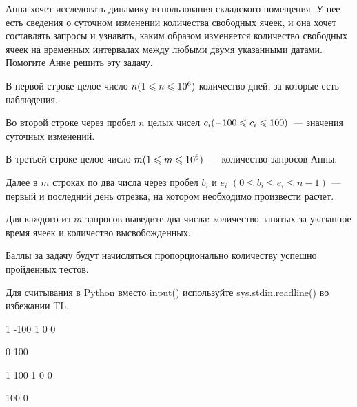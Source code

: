 
Анна хочет исследовать динамику использования складского помещения. У нее есть сведения о 
суточном изменении количества свободных ячеек, и она хочет составлять запросы и узнавать, 
каким образом изменяется количество свободных ячеек на временных интервалах между любыми двумя 
указанными датами. Помогите Анне решить эту задачу.


В первой строке целое число $n\space (1\leq n \leq 10^6)$ количество дней, за которые есть наблюдения.

Во второй строке через пробел $n$ целых чисел $c_i\space (-100\leq c_i \leq 100)$~— значения суточных изменений. 

В третьей строке целое число $m\space (1\leq m \leq 10^6)$~— количество запросов Анны.

Далее в $m$ строках по два числа через пробел $b_i$  и $e_i$  $(0\leq b_i \leq e_i \leq n-1)$ — первый и 
последний день отрезка, на котором необходимо произвести расчет.

\outputfmtSection

Для каждого из $m$ запросов выведите два числа: количество занятых за указанное время ячеек и количество высвобожденных.

\markSection

Баллы за задачу будут начисляться пропорционально количеству успешно пройденных тестов.

\explanationSection

Для считывания в Python вместо input() используйте sys.stdin.readline() во избежании TL.


\begin{myverbbox}[\small]{\vinput}
    1
    -100
    1
    0 0
\end{myverbbox}

\begin{myverbbox}[\small]{\voutput}
    0 100
\end{myverbbox}


\begin{myverbbox}[\small]{\vinput}
    1
    100
    1
    0 0
\end{myverbbox}

\begin{myverbbox}[\small]{\voutput}
    100 0
\end{myverbbox}

